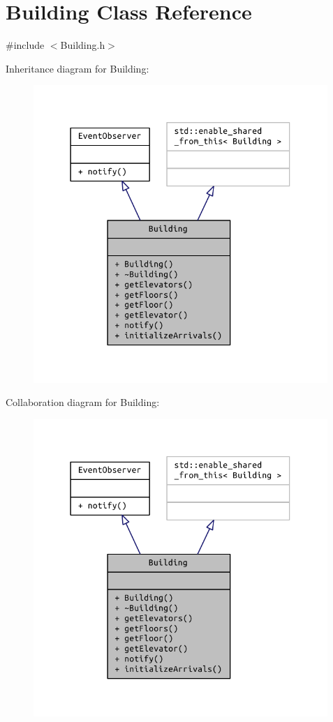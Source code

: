 \hypertarget{class_building}{}\section{Building Class Reference}
\label{class_building}


{\ttfamily \#include $<$Building.\+h$>$}



Inheritance diagram for Building\+:
\nopagebreak
\begin{figure}[H]
\begin{center}
\leavevmode
\includegraphics[width=316pt]{class_building__inherit__graph}
\end{center}
\end{figure}


Collaboration diagram for Building\+:
\nopagebreak
\begin{figure}[H]
\begin{center}
\leavevmode
\includegraphics[width=316pt]{class_building__coll__graph}
\end{center}
\end{figure}
